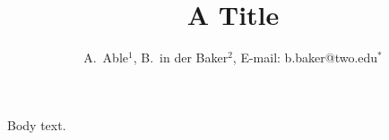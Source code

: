 \documentclass{revtex4-2}
\begin{document}
\title{A Title}
\author{A.~Able$^{1}$, B.~in der Baker$^{2}$, E-mail: b.baker@two.edu$^{*}$}
\maketitle
Body text.
\end{document}
